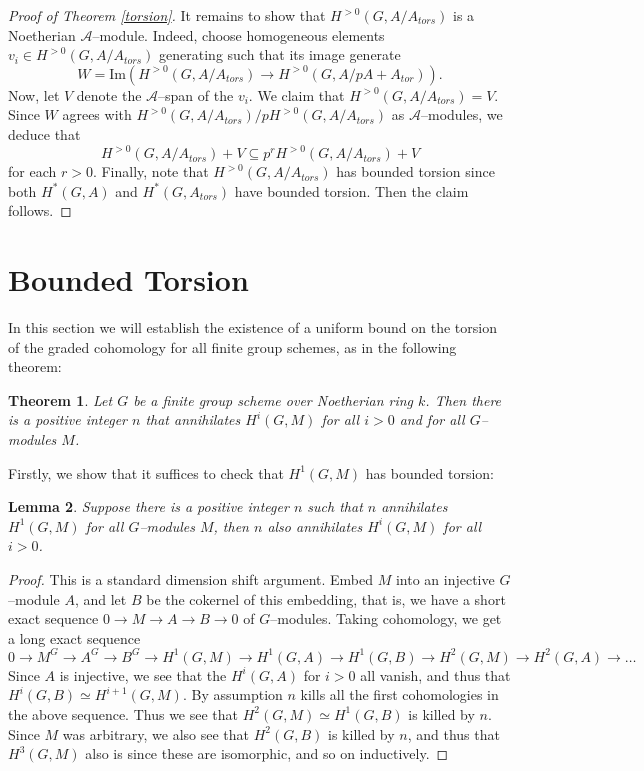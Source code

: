 \documentclass{article}
\theoremstyle{plain}
\newtheorem{Th}{Theorem}[section]
\newtheorem{Lemma}[Th]{Lemma}
\theoremstyle{definition}
\begin{document}
\begin{proof}[Proof of Theorem \ref{torsion}]
    It remains to show that $H^{>0}(G,A/A_{tors})$ is a Noetherian $\mathscr{A}$--module. Indeed, choose homogeneous elements $v_i\in H^{>0}(G,A/A_{tors})$ generating such that its image generate 
    \[
    W=\mathrm{Im}(H^{>0}(G,A/A_{tors})\to H^{>0}(G,A/pA+A_{tor})).
    \]
    Now, let $V$ denote the $\mathscr{A}$--span of the $v_i$. We claim that $H^{>0}(G,A/A_{tors})=V$.  Since $W$ agrees with $H^{>0}(G,A/A_{tors})/pH^{>0}(G,A/A_{tors})$ as $\mathscr{A}$--modules, we deduce that 
    \[
    H^{>0}(G,A/A_{tors})+V\subseteq p^rH^{>0}(G,A/A_{tors}) +V 
    \]
    for each $r>0$. Finally,  note that $H^{>0}(G,A/A_{tors})$ has bounded torsion since both $H^\ast(G,A)$ and $H^\ast(G,A_{tors})$ have bounded torsion. Then the claim follows. 
\end{proof}




\pagebreak


\section{Bounded Torsion}\label{section:boundedtorsion}

In this section we will establish the existence of a uniform bound on the torsion of the graded cohomology for all finite  group schemes, as in the following theorem:

\begin{Th}\label{bounded torsion}
      Let $G$ be a finite group scheme over Noetherian ring $k$. Then there is a positive integer $n$ that annihilates $H^i(G, M)$ for all $i>0$ and for all $G$--modules $M$.
\end{Th}

Firstly, we show that it suffices to check that $H^1(G, M)$ has bounded torsion:

\begin{Lemma}\label{reduction to H1}
    Suppose there is a positive integer $n$ such that $n$ annihilates $H^1(G, M)$ for all $G$--modules $M$, then $n$ also annihilates $H^i(G, M)$ for all $i>0$.
\end{Lemma}

\begin{proof}
    This is a standard dimension shift argument. Embed $M$ into an injective $G$--module $A$, and let $B$ be the cokernel of this embedding, that is, we have a short exact sequence $0\to M\to A\to B\to 0$ of $G$--modules. Taking cohomology, we get a long exact sequence 
    \[
    0\to M^G\to A^G\to B^G\to H^1(G, M)\to H^1(G, A)\to H^1(G, B)\to H^2(G, M)\to H^2(G, A) \to \dots
    \]
Since $A$ is injective, we see that the $H^i(G, A)$ for $i>0$ all vanish, and thus that $H^i(G, B)\simeq H^{i+1}(G, M)$. By assumption $n$ kills all the first cohomologies in the above sequence.
Thus we see that $H^2(G, M)\simeq H^1(G, B)$ is killed by $n$. Since $M$ was arbitrary, we also see that $H^2(G, B)$ is killed by $n$, and thus that $H^3(G, M)$ also is since these are isomorphic, and so on inductively.
\end{proof}
\end{document}
